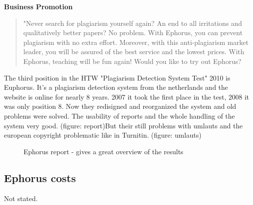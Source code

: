 \textbf{Business Promotion}
\begin{quote}
"Never search for plagiarism yourself again? An end to all irritations and qualitatively better papers? No problem. With Ephorus, you can prevent plagiarism with no extra effort. Moreover, with this anti-plagiarism market leader, you will be assured of the best service and the lowest prices. With Ephorus, teaching will be fun again! Would you like to try out Ephorus?
\end{quote}
\citep{EphorusTest}

The third position in the HTW "Plagiarism Detection System Test" 2010 is Euphorus. It's a plagiarism detection system from the netherlands and the website is online for nearly 8 years.
2007 it took the first place in the test, 2008 it was only position 8. Now they redisigned and reorganized the system and old problems were solved. The usability of reports and the whole handling of the system very good. (figure: report)But their still problems with umlauts and the european copyright problematic like in Turnitin. (figure: umlauts)


 \begin{figure}[!h]
  \centering
  \caption{Ephorus report - gives a great overview of the results}
  \label{fig:Ephorus_report}
\end{figure}




\subsection*{Ephorus costs}
Not stated.

